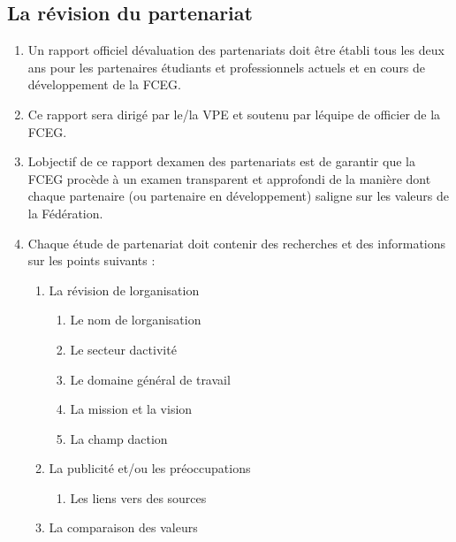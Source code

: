 \subsection{La révision du partenariat}
\label{la-revision-du-partenariat}

\begin{enumerate}
 \item
  Un rapport officiel d\textquotesingle évaluation des partenariats doit être établi tous les deux ans pour les partenaires étudiants et professionnels actuels et en cours de développement de la FCEG.
 \item
  Ce rapport sera dirigé par le/la VPE et soutenu par l\textquotesingle équipe de officier de la FCEG.
 \item
  L\textquotesingle objectif de ce rapport d\textquotesingle examen des partenariats est de garantir que la FCEG procède à un examen transparent et approfondi de la manière dont chaque partenaire (ou partenaire en développement) s\textquotesingle aligne sur les valeurs de la Fédération.
 \item
  Chaque étude de partenariat doit contenir des recherches et des informations sur les points suivants :

  \begin{enumerate}
   \item
    La révision de l\textquotesingle organisation

    \begin{enumerate}
     \item
      Le nom de l\textquotesingle organisation
     \item
      Le secteur d\textquotesingle activité
     \item
      Le domaine général de travail
     \item
      La mission et la vision
     \item
      La champ d\textquotesingle action
    \end{enumerate}
   \item
    La publicité et/ou les préoccupations

    \begin{enumerate}
     \item
      Les liens vers des sources
    \end{enumerate}
   \item
    La comparaison des valeurs


\end{enumerate}
\end{enumerate}
